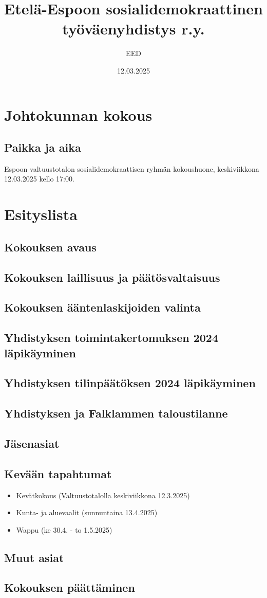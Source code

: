 \documentclass[a4paper,12pt]{article}
\title{Etelä-Espoon sosialidemokraattinen työväenyhdistys r.y.}
\author{EED}
\date{12.03.2025}
\begin{document}
\maketitle
\tableofcontents
\section*{Johtokunnan kokous}
\subsection*{Paikka ja aika}
Espoon valtuustotalon sosialidemokraattisen ryhmän kokoushuone, keskiviikkona 12.03.2025 kello 17:00.
\section*{Esityslista}
\subsection{Kokouksen avaus}
\subsection{Kokouksen laillisuus ja päätösvaltaisuus}
\subsection{Kokouksen ääntenlaskijoiden valinta}
\subsection{Yhdistyksen toimintakertomuksen 2024 läpikäyminen}
\subsection{Yhdistyksen tilinpäätöksen 2024 läpikäyminen}
\subsection{Yhdistyksen ja Falklammen taloustilanne}
\subsection{Jäsenasiat}
\subsection{Kevään tapahtumat}
\begin{itemize}
\item{Kevätkokous} (Valtuustotalolla keskiviikkona 12.3.2025)
\item{Kunta- ja aluevaalit} (sunnuntaina 13.4.2025)
\item{Wappu} (ke 30.4. - to 1.5.2025)
\end{itemize}
\subsection{Muut asiat}
\subsection{Kokouksen päättäminen}
\end{document}
